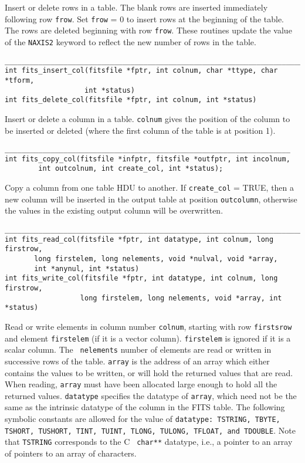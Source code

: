 \documentclass[11pt]{article}
\begin{document}
Insert or delete rows in a table.
The blank rows are
inserted immediately following row {\tt frow}. Set {\tt frow} = 0 to
insert rows at the beginning of the table.  The rows
are deleted beginning with row {\tt frow}.  These routines update the
value of the {\tt NAXIS2} keyword to reflect the new number of rows in
the table.

\begin{verbatim}
_________________________________________________________________________
int fits_insert_col(fitsfile *fptr, int colnum, char *ttype, char *tform,
                   int *status)
int fits_delete_col(fitsfile *fptr, int colnum, int *status)
\end{verbatim}

Insert or delete a column in a table.  {\tt colnum} gives the position of the
column to be inserted or deleted (where the first column of the table is 
at position 1).

\begin{verbatim}
____________________________________________________________________
int fits_copy_col(fitsfile *infptr, fitsfile *outfptr, int incolnum,
        int outcolnum, int create_col, int *status);
\end{verbatim}

Copy a column from one table HDU to another.  If {\tt create\_col} = TRUE,
then a new column will be inserted in the output table at position
{\tt outcolumn}, otherwise the values in the existing output column will be
overwritten. 

\begin{verbatim}
__________________________________________________________________________
int fits_read_col(fitsfile *fptr, int datatype, int colnum, long firstrow,
       long firstelem, long nelements, void *nulval, void *array, 
       int *anynul, int *status)
int fits_write_col(fitsfile *fptr, int datatype, int colnum, long firstrow,
                  long firstelem, long nelements, void *array, int *status)
\end{verbatim}

Read or write elements in column number {\tt colnum}, starting with row
{\tt firstsrow} and element {\tt firstelem} (if it is a vector
column).  {\tt firstelem} is ignored if it is a scalar column. The {\tt
nelements} number of elements are read or written in successive rows of
the table.  {\tt array} is the address of an array which either
contains the  values to be written, or will hold the returned values
that are read.  When reading, {\tt array} must have been allocated
large enough to hold all the returned values. {\tt datatype} specifies
the datatype of {\tt array}, which need not be the same as the
intrinsic datatype of the column in the FITS table.   The following
symbolic constants are allowed for the value of {\tt datatype:
TSTRING, TBYTE, TSHORT, TUSHORT, TINT, TUINT, TLONG, TULONG, TFLOAT,
and TDOUBLE}.  Note that {\tt TSTRING} corresponds to the C {\tt
char**} datatype, i.e., a pointer to an array of pointers to an array
of characters.
\end{document}
